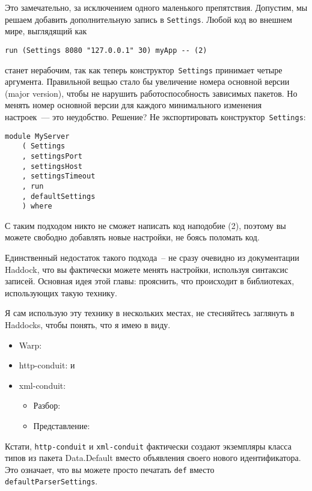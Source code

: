 Это замечательно, за исключением одного маленького
препятствия. Допустим, мы решаем добавить дополнительную запись в
\lstinline!Settings!. Любой код во внешнем мире, выглядящий как
\begin{lstlisting}
run (Settings 8080 "127.0.0.1" 30) myApp -- (2)
\end{lstlisting}
станет нерабочим, так как теперь конструктор~\lstinline!Settings!
принимает четыре аргумента. Правильной вещью стало бы увеличение номера
основной версии (major version), чтобы не нарушить работоспособность
зависимых пакетов. Но менять номер основной версии для каждого
минимального изменения настроек~--- это неудобство. Решение? Не
экспортировать конструктор~\lstinline!Settings!:
\begin{lstlisting}
module MyServer
    ( Settings
    , settingsPort
    , settingsHost
    , settingsTimeout
    , run
    , defaultSettings
    ) where
\end{lstlisting}

С таким подходом никто не сможет написать код наподобие (2), поэтому
вы можете свободно добавлять новые настройки, не боясь поломать код.

Единственный недостаток такого подхода~-- не сразу очевидно из
документации Haddock, что вы фактически можете менять настройки,
используя синтаксис записей. Основная идея этой главы: прояснить, что
происходит в библиотеках, использующих такую технику.

Я сам использую эту технику в нескольких местах, не стесняйтесь
заглянуть в Haddocks, чтобы понять, что я имею в виду.
\begin{itemize}
\item Warp: 
\item http-conduit: 
  и 
\item xml-conduit:
  \begin{itemize}
  \item Разбор: 
  \item Представление: 
  \end{itemize}
\end{itemize}

Кстати, \lstinline!http-conduit! и \lstinline!xml-conduit! фактически
создают экземпляры класса типов  из пакета Data.Default вместо объявления
своего нового идентификатора. Это означает, что вы можете просто
печатать \lstinline!def! вместо \lstinline!defaultParserSettings!.
